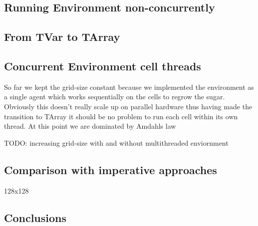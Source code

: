 \subsection{Running Environment non-concurrently}

\subsection{From TVar to TArray}

\subsection{Concurrent Environment cell threads}
So far we kept the grid-size constant because we implemented the environment as a single agent which works sequentially on the cells to regrow the sugar. Obviously this doesn't really scale up on parallel hardware thus having made the transition to TArray it should be no problem to run each cell within its own thread.
At this point we are dominated by Amdahls law

TODO: increasing grid-size with and without multithreaded enviornment

\subsection{Comparison with imperative approaches}
128x128

\subsection{Conclusions}